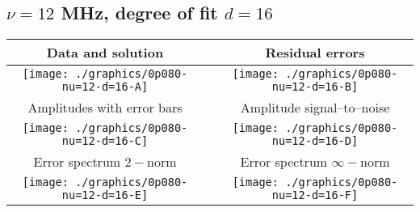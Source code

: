 

% 

\clearpage{}
\break{}

\subsection{$\nu = 12$ MHz, degree of fit $d = 16$}

\begin{table}[h]
    \begin{center}
        \begin{tabular}{ccc}
            Data and solution & \quad & Residual errors \\\hline
            \texttt{[image: ./graphics/0p080-nu=12-d=16-A]} &&
            \texttt{[image: ./graphics/0p080-nu=12-d=16-B]} \\[15pt]
            Amplitudes with error bars && Amplitude signal--to--noise \\\hline
            \texttt{[image: ./graphics/0p080-nu=12-d=16-C]} &&
            \texttt{[image: ./graphics/0p080-nu=12-d=16-D]} \\[15pt]
            Error spectrum $2-$norm && Error spectrum $\infty-$norm \\\hline
            \texttt{[image: ./graphics/0p080-nu=12-d=16-E]} &&
            \texttt{[image: ./graphics/0p080-nu=12-d=16-F]} \\[15pt]
        \end{tabular}
    \end{center}
\label{fig:elev=80, nu=12}
\end{table}



\endinput
